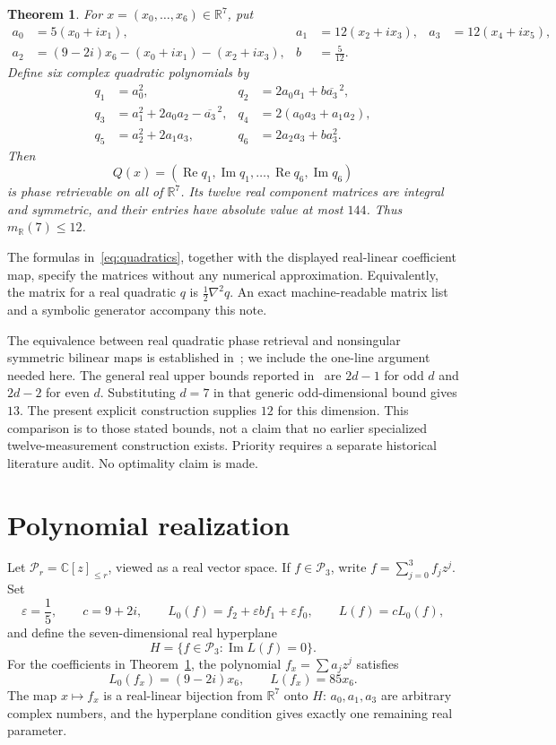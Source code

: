 \documentclass[11pt]{article}
\newtheorem{theorem}{Theorem}
\theoremstyle{remark}\newtheorem{remark}[theorem]{Remark}
\newcommand{\R}{\mathbb R}\newcommand{\C}{\mathbb C}
\newcommand{\im}{\operatorname{Im}}\newcommand{\re}{\operatorname{Re}}
\begin{document}
\begin{theorem}\label{thm:main}
For $x=(x_0,\ldots,x_6)\in\R^7$, put
\begin{align*}
 a_0&=5(x_0+i x_1), & a_1&=12(x_2+i x_3), & a_3&=12(x_4+i x_5),\\
 a_2&=(9-2i)x_6-(x_0+i x_1)-(x_2+i x_3), & b&=\frac5{12}.
\end{align*}
Define six complex quadratic polynomials by
\begin{align}
 q_1&=a_0^2, & q_2&=2a_0a_1+b\overline{a_3}^{\,2},\nonumber\\
 q_3&=a_1^2+2a_0a_2-\overline{a_3}^{\,2}, &
 q_4&=2(a_0a_3+a_1a_2),\label{eq:quadratics}\\
 q_5&=a_2^2+2a_1a_3, & q_6&=2a_2a_3+b a_3^2.\nonumber
\end{align}
Then
\[
 Q(x)=(\re q_1,\im q_1,\ldots,\re q_6,\im q_6)
\]
is phase retrievable on all of $\R^7$. Its twelve real component matrices are integral and symmetric, and their entries have absolute value at most $144$. Thus $m_{\R}(7)\le12$.
\end{theorem}

The formulas in~\eqref{eq:quadratics}, together with the displayed real-linear coefficient map, specify the matrices without any numerical approximation. Equivalently, the matrix for a real quadratic $q$ is $\frac12\nabla^2 q$. An exact machine-readable matrix list and a symbolic generator accompany this note.

The equivalence between real quadratic phase retrieval and nonsingular symmetric bilinear maps is established in~\cite{WX}; we include the one-line argument needed here. The general real upper bounds reported in~\cite{WX,XuSurvey} are $2d-1$ for odd $d$ and $2d-2$ for even $d$. Substituting $d=7$ in that generic odd-dimensional bound gives $13$. The present explicit construction supplies $12$ for this dimension. This comparison is to those stated bounds, not a claim that no earlier specialized twelve-measurement construction exists. Priority requires a separate historical literature audit. No optimality claim is made.

\section{Polynomial realization}
Let $\mathcal P_r=\C[z]_{\le r}$, viewed as a real vector space. If $f\in\mathcal P_3$, write $f=\sum_{j=0}^3 f_jz^j$. Set
\[
 \varepsilon=\frac15,\qquad c=9+2i,\qquad
 L_0(f)=f_2+\varepsilon b f_1+\varepsilon f_0,
 \qquad L(f)=cL_0(f),
\]
and define the seven-dimensional real hyperplane
\[
 H=\{f\in\mathcal P_3:\im L(f)=0\}.
\]
For the coefficients in Theorem~\ref{thm:main}, the polynomial $f_x=\sum a_jz^j$ satisfies
\[
 L_0(f_x)=(9-2i)x_6,\qquad L(f_x)=85x_6.
\]
The map $x\mapsto f_x$ is a real-linear bijection from $\R^7$ onto $H$: $a_0,a_1,a_3$ are arbitrary complex numbers, and the hyperplane condition gives exactly one remaining real parameter.
\end{document}
